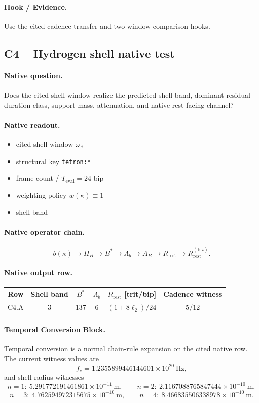 \paragraph{Hook / Evidence.} Use the cited cadence-transfer and two-window comparison hooks.


\subsection{C4 -- Hydrogen shell native test}\label{app:c4}
\paragraph{Native question.} Does the cited shell window realize the predicted shell band, dominant residual-duration class, support mass, attenuation, and native rest-facing channel?
\paragraph{Native readout.}
\begin{itemize}
\item cited shell window $\omega_{\mathrm{H}}$
\item structural key \texttt{tetron:*}
\item frame count / $T_{\mathrm{eval}}=24$ bip
\item weighting policy $w(\kappa)\equiv 1$
\item shell band
\end{itemize}
\paragraph{Native operator chain.}
\[
b(\kappa)\to H_B\to B^*\to \Lambda_b\to A_B\to R_{\mathrm{rest}}\to R_{\mathrm{rest}}^{(\mathrm{biz})}.
\]
\paragraph{Native output row.}
\begin{center}
\small
\begin{tabular}{lccccc}
\toprule
Row & Shell band & $B^*$ & $\Lambda_b$ & $R_{\mathrm{rest}}$ [trit/bip] & Cadence witness \\
\midrule
C4.A & 3 & 137 & 6 & $(1+8\ell_2)/24$ & $5/12$ \\
\bottomrule
\end{tabular}
\end{center}
\paragraph{Temporal Conversion Block.} Temporal conversion is a normal chain-rule expansion on the cited native row. The current witness values are
\[
f_e = 1.2355899446144601\times 10^{20}\ \text{Hz},
\]
and shell-radius witnesses
\[
n=1:\ 5.291772191461861\times 10^{-11}\ \text{m},\qquad
n=2:\ 2.1167088765847444\times 10^{-10}\ \text{m},
\]
\[
n=3:\ 4.762594972315675\times 10^{-10}\ \text{m},\qquad
n=4:\ 8.466835506338978\times 10^{-10}\ \text{m}.
\]
